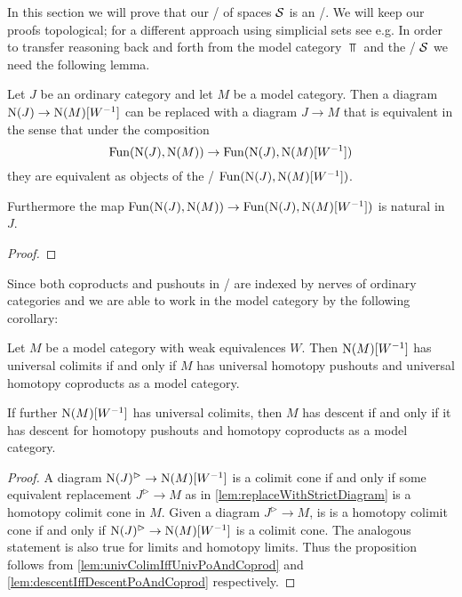 In this section we will prove that our \inftycat/ of spaces $\mathcal{S}$ is an \inftytop/.
We will keep our proofs topological; for a different approach using simplicial sets see e.g. %
In order to transfer reasoning back and forth from the model category $\Top$ and the \inftycat/ $\mathcal{S}$ we need the following lemma.
\begin{lemma}\label{lem:replaceWithStrictDiagram} %
    Let $J$ be an ordinary category and let $M$ be a model category.
    Then a diagram $\operatorname{N}(J)\to\operatorname{N}(M)[W^{-1}]$ can be replaced with a diagram $J\to M$ that is equivalent in the sense that under the composition
    \begin{equation*}
        \Fun(\N(J),\N(M))\to\Fun(\N(J),\N(M)[W^{-1}]) %
    \end{equation*} 
    they are equivalent as objects of the \inftycat/ $\operatorname{Fun}(\operatorname{N}(J),\operatorname{N}(M)[W^{-1}])$.

    Furthermore the map $\operatorname{Fun}(\operatorname{N}(J),\operatorname{N}(M))\to\operatorname{Fun}(\operatorname{N}(J),\operatorname{N}(M)[W^{-1}])$ is natural in $J$.
    \begin{proof}
    \end{proof}
\end{lemma}
Since both coproducts and pushouts in \inftycats/ are indexed by nerves of ordinary categories and we are able to work in the model category by the following corollary:
\begin{corollary}\label{cor:sufficientToProveInModCat}
    Let $M$ be a model category with weak equivalences $W$. 
    Then $\operatorname{N}(M)[W^{-1}]$ has universal colimits if and only if $M$ has universal homotopy pushouts and universal homotopy coproducts as a model category.
    
    If further $\operatorname{N}(M)[W^{-1}]$ has universal colimits, then $M$ has descent if and only if it has descent for homotopy pushouts and homotopy coproducts as a model category.
    \begin{proof}
        A diagram $\operatorname{N}(J)^{\rhd}\to\operatorname{N}(M)[W^{-1}]$ is a colimit cone if and only if some equivalent replacement $J^{\rhd}\to M$ as in \cref{lem:replaceWithStrictDiagram} is a homotopy colimit cone in $M$.
        Given a diagram $J^{\rhd}\to M$, is is a homotopy colimit cone if and only if $\operatorname{N}(J)^{\rhd}\to\operatorname{N}(M)[W^{-1}]$ is a colimit cone.
        The analogous statement is also true for limits and homotopy limits.
        Thus the proposition follows from \cref{lem:univColimIffUnivPoAndCoprod} and \cref{lem:descentIffDescentPoAndCoprod} respectively.
    \end{proof}
\end{corollary}
